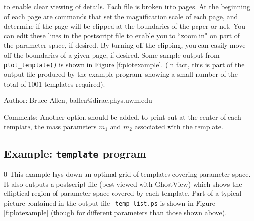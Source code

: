 to enable clear viewing of details.  Each file is broken into pages.
At the beginning of each page are commands that set the magnification
scale of each page, and determine if the page will be clipped at the
boundaries of the paper or not.  You can edit these lines in the
postscript file to enable you to ``zoom in" on part of the parameter
space, if desired.  By turning off the clipping, you can easily move
off the boundaries of a given page, if desired.  Some sample output
from {\tt plot\_template()} is shown in Figure \ref{f:plotexample}.
(In fact, this is part of the output file produced by the example
program, showing a small number of the total of 1001 templates
required).
\begin{description}
\item{Author:}
Bruce Allen, ballen@dirac.phys.uwm.edu
\item{Comments:}
Another option should be added, to print out at the center of each
template, the mass parameters $m_1$ and $m_2$ associated with the
template.
\end{description}
\clearpage

\subsection{Example: {\tt template} program}
\setcounter{equation}0
This example lays down an optimal grid of templates covering parameter
space.  It also outputs a postscript file (best viewed with GhostView)
which shows the elliptical region of parameter space covered by each
template.
Part of a typical picture contained in the output file {\tt
temp\_list.ps} is shown in Figure \ref{f:plotexample} (though for
different parameters than those shown above).
\clearpage

